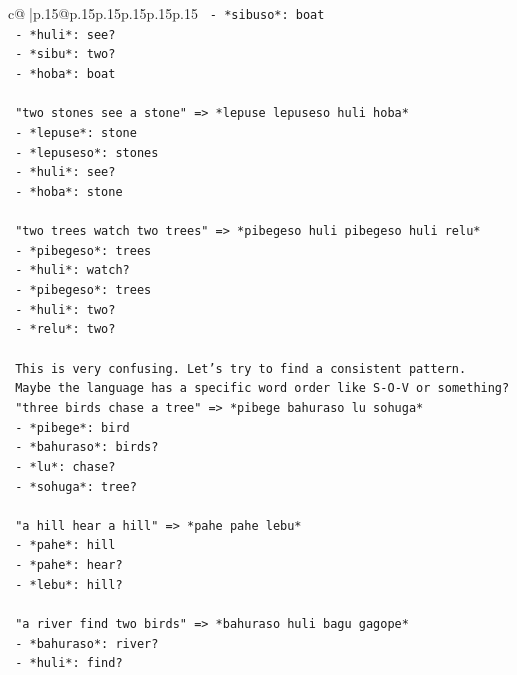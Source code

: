 \documentclass{article}
\begin{document}
{\begin{supertabular}{c@{$\;$}|p{.15\linewidth}@{}p{.15\linewidth}p{.15\linewidth}p{.15\linewidth}p{.15\linewidth}p{.15\linewidth}}
{{{\texttt{   {-} *sibuso*: boat} \\
\texttt{   {-} *huli*: see?} \\
\texttt{   {-} *sibu*: two?} \\
\texttt{   {-} *hoba*: boat} \\
\\ 
\texttt{   "two stones see a stone" => *lepuse lepuseso huli hoba*} \\
\texttt{   {-} *lepuse*: stone} \\
\texttt{   {-} *lepuseso*: stones} \\
\texttt{   {-} *huli*: see?} \\
\texttt{   {-} *hoba*: stone} \\
\\ 
\texttt{   "two trees watch two trees" => *pibegeso huli pibegeso huli relu*} \\
\texttt{   {-} *pibegeso*: trees} \\
\texttt{   {-} *huli*: watch?} \\
\texttt{   {-} *pibegeso*: trees} \\
\texttt{   {-} *huli*: two?} \\
\texttt{   {-} *relu*: two?} \\
\\ 
\texttt{   This is very confusing. Let's try to find a consistent pattern.} \\
\texttt{   Maybe the language has a specific word order like S{-}O{-}V or something?} \\
\texttt{   "three birds chase a tree" => *pibege bahuraso lu sohuga*} \\
\texttt{   {-} *pibege*: bird} \\
\texttt{   {-} *bahuraso*: birds?} \\
\texttt{   {-} *lu*: chase?} \\
\texttt{   {-} *sohuga*: tree?} \\
\\ 
\texttt{   "a hill hear a hill" => *pahe pahe lebu*} \\
\texttt{   {-} *pahe*: hill} \\
\texttt{   {-} *pahe*: hear?} \\
\texttt{   {-} *lebu*: hill?} \\
\\ 
\texttt{   "a river find two birds" => *bahuraso huli bagu gagope*} \\
\texttt{   {-} *bahuraso*: river?} \\
\texttt{   {-} *huli*: find?} \\
}}}
\end{supertabular}}
\end{document}
